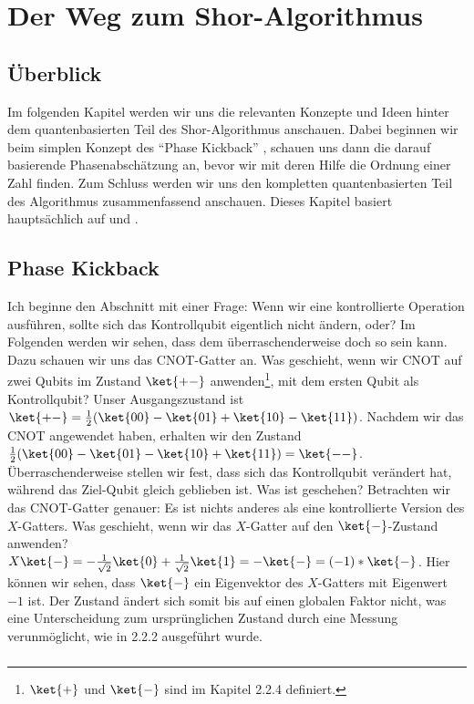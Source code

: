\chapter{Der Weg zum Shor-Algorithmus}
\section{Überblick}
Im folgenden Kapitel werden wir uns die relevanten Konzepte und Ideen hinter dem quantenbasierten Teil des Shor-Algorithmus anschauen. Dabei beginnen wir beim simplen Konzept des "`Phase Kickback"' , schauen uns dann die darauf basierende Phasenabschätzung an, bevor wir mit deren Hilfe die Ordnung einer Zahl finden. Zum Schluss werden wir uns den kompletten quantenbasierten Teil des Algorithmus zusammenfassend anschauen. Dieses Kapitel basiert hauptsächlich auf \cite{QC} und \cite{QK}.

\section{Phase Kickback}
Ich beginne den Abschnitt mit einer Frage: Wenn wir eine kontrollierte Operation ausführen, sollte sich das Kontrollqubit eigentlich nicht ändern, oder? Im Folgenden werden wir sehen, dass dem überraschenderweise doch so sein kann. Dazu schauen wir uns das CNOT-Gatter an. Was geschieht, wenn wir CNOT auf zwei Qubits im Zustand $\ket{+-}$ anwenden\footnote{$\ket{+}$ und $\ket{-}$ sind im Kapitel 2.2.4 definiert.}, mit dem ersten Qubit als Kontrollqubit? Unser Ausgangszustand ist $\ket{+-} = \frac{1}{2}(\ket{00} - \ket{01} + \ket{10} - \ket{11})$. Nachdem wir das CNOT angewendet haben, erhalten wir den Zustand $\frac{1}{2}(\ket{00} - \ket{01} - \ket{10} + \ket{11}) = \ket{--}$. Überraschenderweise stellen wir fest, dass sich das Kontrollqubit verändert hat, während das Ziel-Qubit gleich geblieben ist. Was ist geschehen? Betrachten wir das CNOT-Gatter genauer: Es ist nichts anderes als eine kontrollierte Version des $X$-Gatters. Was geschieht, wenn wir das $X$-Gatter auf den $\ket{-}$-Zustand anwenden? $X\ket{-} = -\frac{1}{\sqrt{2}}\ket{0} + \frac{1}{\sqrt{2}}\ket{1} = -\ket{-} = (-1)*\ket{-}$. Hier können wir sehen, dass $\ket{-}$ ein Eigenvektor des $X$-Gatters mit Eigenwert $-1$ ist. Der Zustand ändert sich somit bis auf einen globalen Faktor nicht, was eine Unterscheidung zum ursprünglichen Zustand durch eine Messung verunmöglicht, wie in 2.2.2 ausgeführt wurde.

\paragraph{}

